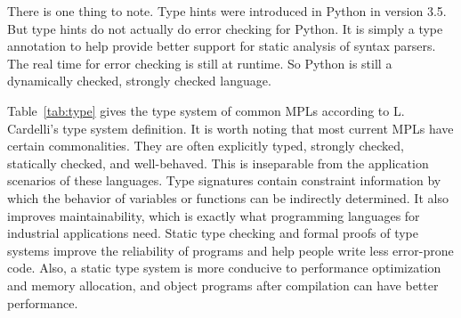 There is one thing to note.
Type hints were introduced in Python in version 3.5.
But type hints do not actually do error checking for Python.
It is simply a type annotation to help provide better support
for static analysis of syntax parsers.
The real time for error checking is still at runtime.
So Python is still a dynamically checked, strongly checked language.

Table~\ref{tab:type} gives the type system of common MPLs according
to L. Cardelli's type system definition.
It is worth noting that most current MPLs have certain commonalities.
They are often explicitly typed, strongly checked, statically checked, and well-behaved.
This is inseparable from the application scenarios of these languages.
Type signatures contain constraint information by which the behavior of
variables or functions can be indirectly determined.
It also improves maintainability, which is exactly what programming languages
for industrial applications need.
Static type checking and formal proofs of type systems improve the reliability
of programs and help people write less error-prone code.
Also, a static type system is more conducive to performance optimization
and memory allocation, and object programs after compilation can have better performance.
